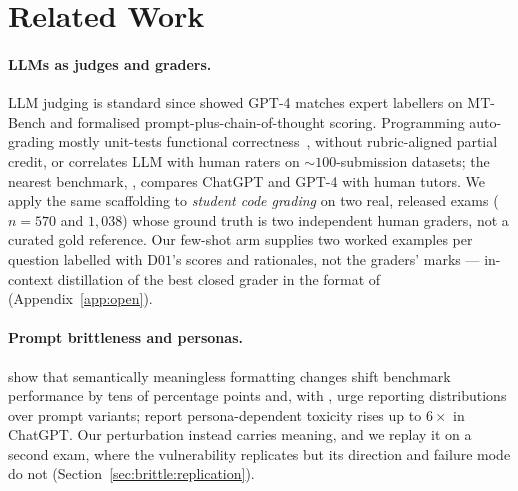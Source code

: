 \section{Related Work}
\label{sec:related}

\paragraph{LLMs as judges and graders.}
LLM judging is standard since \citet{zheng2023judgingllmasajudgemtbenchchatbot} showed GPT-4 matches expert labellers on MT-Bench and \citet{liu2023gevalnlgevaluationusing} formalised prompt-plus-chain-of-thought scoring. Programming auto-grading mostly unit-tests functional correctness~\citep{messer2024automatedgradingfeedbacktools}, without rubric-aligned partial credit, or correlates LLM with human raters on $\sim 100$-submission datasets; the nearest benchmark, \citet{phung2023generativeaiprogrammingeducation}, compares ChatGPT and GPT-4 with human tutors. We apply the same scaffolding to \emph{student code grading} on two real, released exams ($n = 570$ and $1{,}038$) whose ground truth is two independent human graders, not a curated gold reference. Our few-shot arm supplies two worked examples per question labelled with D$01$'s scores and rationales, not the graders' marks --- in-context distillation of the best closed grader in the format of \citet{brown2020languagemodelsfewshotlearners} (Appendix~\ref{app:open}).

\paragraph{Prompt brittleness and personas.}
\citet{sclar2024quantifyinglanguagemodelssensitivity} show that semantically meaningless formatting changes shift benchmark performance by tens of percentage points and, with \citet{mizrahi2024stateartmultipromptllm}, urge reporting distributions over prompt variants; \citet{deshpande2023toxicitychatgptanalyzingpersonaassigned} report persona-dependent toxicity rises up to $6\times$ in ChatGPT. Our perturbation instead carries meaning, and we replay it on a second exam, where the vulnerability replicates but its direction and failure mode do not (Section~\ref{sec:brittle:replication}).

